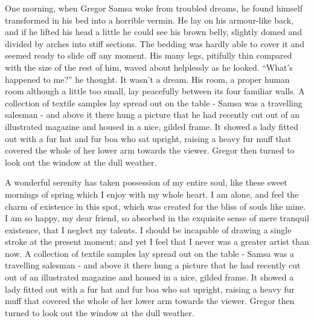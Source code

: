 \documentclass[twoside,12pt,a4paper]{scrbook}
\begin{document}
\begin{pages}
  \begin{Rightside}
    \beginnumbering\pstart
    One morning, when Gregor Samsa woke from
    troubled dreams, he found himself transformed in his bed into a
    horrible vermin. He lay on his armour-like back, and if he lifted his
    head a little he could see his brown belly, slightly domed and divided by
    arches into stiff sections. The bedding was hardly able to
    cover it and seemed ready to slide off any moment. His many legs,
    pitifully thin compared with the size of the rest of him, waved about
    helplessly as he looked. \enquote{What's happened to me?} he thought. It
    wasn't a dream. His room, a proper human room although a
    little too small, lay peacefully between its four familiar walls. A
    collection of textile samples lay spread out on the table -
    Samsa was a travelling salesman - and
    above it there hung a picture that he had recently cut out of an
    illustrated magazine and housed in a nice, gilded frame. It showed a
    lady fitted out with a fur hat and fur boa who sat upright, raising a
    heavy fur muff that covered the whole of her lower arm towards the
    viewer. Gregor then turned to look out the window at the dull weather.

    A wonderful serenity has taken possession of my entire
    soul, like these sweet mornings of spring which I enjoy with my whole
    heart. I am alone, and feel the charm of existence in this spot, which was
    created for the bliss of souls like mine. I am so happy, my dear
    friend, so absorbed in the exquisite sense of mere tranquil existence,
    that I neglect my talents. I should be incapable of drawing a single
    stroke at the present moment; and yet I feel that I never was a greater
    artist than now. A collection of textile samples lay spread out on the
    table - Samsa was a travelling
    salesman - and above it there hung a picture that he had recently cut out
    of an illustrated magazine and housed in a nice, gilded frame. It
    showed a lady fitted out with a fur hat and fur boa who sat upright,
    raising a heavy fur muff that covered the whole of her lower arm
    towards the viewer. Gregor then turned to look out the window at the
    dull weather.
    \pend\endnumbering
  \end{Rightside}
  \Pages

\end{pages}
\end{document}
